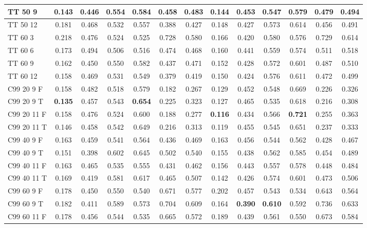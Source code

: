 \documentclass{article}
\begin{document}
\begin{tabular}{|l|c|c|c|c|c|c||c|c|c|c|c|c|}
TT 50  9 & 0.143 & 0.446 & 0.554 & 0.584 & 0.458 & 0.483 & 0.144 & 0.453 & 0.547 & 0.579 & 0.479 & 0.494\\ \hline
TT 50 12 & 0.181 & 0.468 & 0.532 & 0.557 & 0.388 & 0.427 & 0.148 & 0.427 & 0.573 & 0.614 & 0.456 & 0.491\\ \hline
TT 60  3 & 0.218 & 0.476 & 0.524 & 0.525 & 0.728 & 0.580 & 0.166 & 0.420 & 0.580 & 0.576 & 0.729 & 0.614\\ \hline
TT 60  6 & 0.173 & 0.494 & 0.506 & 0.516 & 0.474 & 0.468 & 0.160 & 0.441 & 0.559 & 0.574 & 0.511 & 0.518\\ \hline
TT 60  9 & 0.162 & 0.450 & 0.550 & 0.582 & 0.437 & 0.471 & 0.152 & 0.428 & 0.572 & 0.601 & 0.487 & 0.510\\ \hline
TT 60 12 & 0.158 & 0.469 & 0.531 & 0.549 & 0.379 & 0.419 & 0.150 & 0.424 & 0.576 & 0.611 & 0.472 & 0.499\\ \hline\hline
C99 20  9 F & 0.158 & 0.482 & 0.518 & 0.579 & 0.182 & 0.267 & 0.129 & 0.452 & 0.548 & 0.669 & 0.226 & 0.326\\ \hline
C99 20  9 T & \textbf{0.135} & 0.457 & 0.543 & \textbf{0.654} & 0.225 & 0.323 & 0.127 & 0.465 & 0.535 & 0.618 & 0.216 & 0.308\\ \hline
C99 20 11 F & 0.158 & 0.476 & 0.524 & 0.600 & 0.188 & 0.277 & \textbf{0.116} & 0.434 & 0.566 & \textbf{0.721} & 0.255 & 0.363\\ \hline
C99 20 11 T & 0.146 & 0.458 & 0.542 & 0.649 & 0.216 & 0.313 & 0.119 & 0.455 & 0.545 & 0.651 & 0.237 & 0.333\\ \hline
C99 40  9 F & 0.163 & 0.459 & 0.541 & 0.564 & 0.436 & 0.469 & 0.163 & 0.456 & 0.544 & 0.562 & 0.428 & 0.467\\ \hline
C99 40  9 T & 0.151 & 0.398 & 0.602 & 0.645 & 0.502 & 0.540 & 0.155 & 0.438 & 0.562 & 0.585 & 0.454 & 0.489\\ \hline
C99 40 11 F & 0.163 & 0.465 & 0.535 & 0.555 & 0.431 & 0.462 & 0.156 & 0.443 & 0.557 & 0.578 & 0.448 & 0.484\\ \hline
C99 40 11 T & 0.169 & 0.419 & 0.581 & 0.617 & 0.465 & 0.507 & 0.142 & 0.426 & 0.574 & 0.601 & 0.473 & 0.506\\ \hline
C99 60  9 F & 0.178 & 0.450 & 0.550 & 0.540 & 0.671 & 0.577 & 0.202 & 0.457 & 0.543 & 0.534 & 0.643 & 0.564\\ \hline
C99 60  9 T & 0.182 & 0.411 & 0.589 & 0.573 & 0.704 & 0.609 & 0.164 & \textbf{0.390} & \textbf{0.610} & 0.592 & 0.736 & 0.633\\ \hline
C99 60 11 F & 0.178 & 0.456 & 0.544 & 0.535 & 0.665 & 0.572 & 0.189 & 0.439 & 0.561 & 0.550 & 0.673 & 0.584\\ \hline

\end{tabular}
\end{document}
